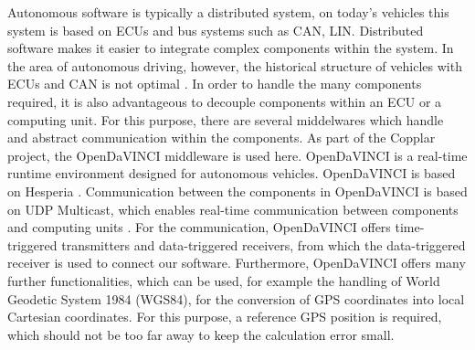 Autonomous software is typically a distributed system, on today's vehicles this system is based on ECUs and bus systems such as CAN, LIN.
Distributed software makes it easier to integrate complex components within the system. In the area of autonomous driving, however,
the historical structure of vehicles with ECUs and CAN is not optimal \cite{Broy2006}. In order to handle the many components required,
it is also advantageous to decouple components within an ECU or a computing unit. For this purpose,
there are several middelwares which handle and abstract communication within the components. As part of the Copplar project, the OpenDaVINCI middleware is used here.
OpenDaVINCI is a real-time runtime environment designed for autonomous vehicles. OpenDaVINCI is based on Hesperia \cite{Berger2010}. 
Communication between the components in OpenDaVINCI is based on UDP Multicast, which enables real-time communication between components and computing units \cite{Kurose2013} .
For the communication, OpenDaVINCI offers time-triggered transmitters and data-triggered receivers, 
from which the data-triggered receiver is used to connect our software. Furthermore, OpenDaVINCI offers many further functionalities,
which can be used, for example the handling of World Geodetic System 1984 (WGS84), for the conversion of GPS coordinates into local Cartesian coordinates.
For this purpose, a reference GPS position is required, which should not be too far away to keep the calculation error small.






